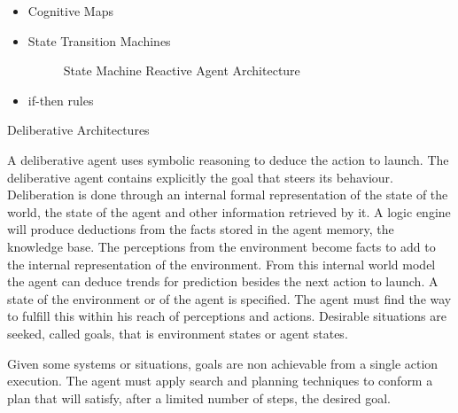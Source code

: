 \documentclass[11pt,oneside,a4paper,openright]{report}
\begin{document}
\begin{description}
\begin{itemize}
		\item Cognitive Maps
		\item State Transition Machines %

		\begin{figure}[h]
		\centering
		\setlength\fboxsep{0pt}
		\setlength\fboxrule{0.5pt}
		\caption{State Machine Reactive Agent Architecture}
		\label{fig:StateMachine}
		\end{figure}

		\item if-then rules
	\end{itemize}
	
	\item Deliberative Architectures

	A deliberative agent uses symbolic reasoning to deduce the action to launch. The deliberative agent
	contains explicitly the goal that steers its behaviour. Deliberation is done through an internal formal 
	representation of the state of the world, the state of the agent and other information retrieved by
	it. A logic engine will produce deductions from the facts stored in the agent memory, the knowledge
	base. The perceptions from the environment become facts to add to the internal representation of
	the environment. From this internal world model the agent can deduce trends for prediction besides
	the next action to launch. A state of the environment or of the agent is specified. The agent must find 
	the way to fulfill this within his reach of perceptions and actions. Desirable situations are seeked, 
	called goals, that is environment states or agent states. 

	Given some systems or situations, goals are non achievable from a single action execution. The agent 
	must apply search and planning techniques to conform a plan that will satisfy, after a limited number of 
	steps, the desired goal.


\end{description}
\end{document}
